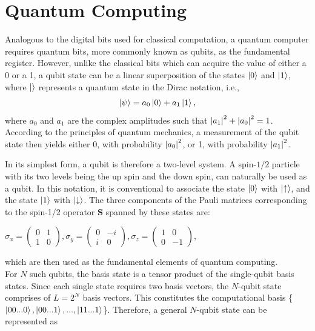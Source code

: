 \documentclass[../main.tex]{subfiles}
\begin{document}
\section{Quantum Computing}
Analogous to the digital bits used for classical computation, a quantum computer requires quantum bits, more commonly known as qubits, as the fundamental register. However, unlike the classical bits which can acquire the value of either a 0 or a 1, a qubit state can be a linear superposition of the states $\ket{0}$ and $\ket{1}$, where $\ket{}$ represents a quantum state in the Dirac notation, i.e.,
\begin{equation}
\ket{\psi}= a_0 \ket{0} + a_1 \ket{1},  \label{eq:b1}
\end{equation}
where $a_0$ and $a_1$ are the complex amplitudes such that ${\abs{a_1}}^2 +{\abs{a_0}}^2 =1$. According to the principles of quantum mechanics, a measurement of the qubit state then yields either 0, with probability ${\abs{a_0}}^2$, or 1, with probability ${\abs{a_1}}^2$. 

In its simplest form, a qubit is therefore a two-level system. A spin-$1/2$ particle with its two levels being the up spin and the down spin, can naturally be used as a qubit. In this notation, it is conventional to associate the state $\ket{0}$ with $\ket{\uparrow}$, and the state $\ket{1}$ with $\ket{\downarrow}$. The three components of the Pauli matrices corresponding to the spin-1/2 operator \textbf{S} spanned by these states are:
\begin{center}
$ \sigma_x= \begin{pmatrix}
0 & 1\\
1 & 0
\end{pmatrix}, \sigma_y= \begin{pmatrix}
0 & -i\\
i & 0
\end{pmatrix}, \sigma_z= \begin{pmatrix}
1 & 0\\
0 & -1
\end{pmatrix},
$\\
\end{center}
which are then used as the fundamental elements of quantum computing.\\

For $N$ such qubits, the basis state is a tensor product of the single-qubit basis states. Since each single state requires two basis vectors, the $N$-qubit state comprises of $L=2^N$ basis vectors. This constitutes the computational basis
\{$\ket{00...0}, \ket{00...1},..., \ket{11...1}$\}. Therefore, a general $N$-qubit state can be represented as
\end{document}

